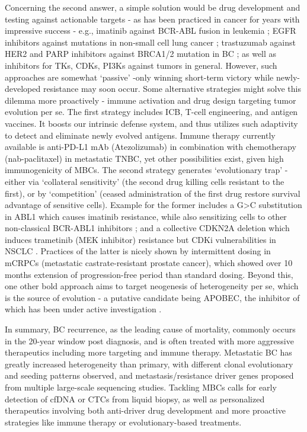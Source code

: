 Concerning the second answer, a simple solution would be drug development and testing against actionable targets - as has been practiced in cancer for years with impressive success - e.g., imatinib against BCR-ABL fusion in leukemia \citep{an2010bcr}; EGFR inhibitors against mutations in non-small cell lung cancer \citep{gerber2008egfr}; trastuzumab against HER2 \citep{gajria2011her2} and PARP inhibitors against BRCA1/2 mutation in BC \citep{dziadkowiec2016parp}; as well as inhibitors for TKs, CDKs, PI3Ks against tumors in general. However, such approaches are somewhat ‘passive’ -only winning short-term victory while newly-developed resistance may soon occur. Some alternative strategies might solve this dilemma more proactively - immune activation and drug design targeting tumor evolution per se. The first strategy includes ICB, T-cell engineering, and antigen vaccines. It boosts our intrinsic defense system, and thus utilizes such adaptivity to detect and eliminate newly evolved antigens. Immune therapy currently available is anti-PD-L1 mAb (Atezolizumab) in combination with chemotherapy (nab-paclitaxel) in metastatic TNBC, yet other possibilities exist, given high immunogenicity of MBCs. The second strategy generates ‘evolutionary trap’ - either via ‘collateral sensitivity’ (the second drug killing cells resistant to the first), or by ‘competition’ (ceased administration of the first drug restore survival advantage of sensitive cells). Example for the former includes a G>C substitution in ABL1 which causes imatinib resistance, while also sensitizing cells to other non-classical BCR-ABL1 inhibitors \citep{zhao2016exploiting}; and a collective CDKN2A deletion which induces trametinib (MEK inhibitor) resistance but CDKi vulnerabilities in NSCLC \citep{acar2020exploiting}. Practices of the latter is nicely shown by intermittent dosing in mCRPCs (metastatic castrate-resistant prostate cancer), which showed over 10 months extension of progression-free period than standard dosing. Beyond this, one other bold approach aims to target neogenesis of heterogeneity per se, which is the source of evolution - a putative candidate being APOBEC, the inhibitor of which has been under active investigation \citep{barzak2019selective}.

In summary, BC recurrence, as the leading cause of mortality, commonly occurs in the 20-year window post diagnosis, and is often treated with more aggressive therapeutics including more targeting and immune therapy. Metastatic BC has greatly increased heterogeneity than primary, with different clonal evolutionary and seeding patterns observed, and metastasis/resistance driver genes proposed from multiple large-scale sequencing studies. Tackling MBCs calls for early detection of cfDNA or CTCs from liquid biopsy, as well as personalized therapeutics involving both anti-driver drug development and more proactive strategies like immune therapy or evolutionary-based treatments.

